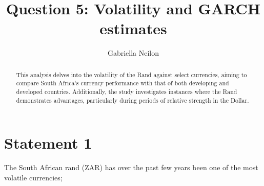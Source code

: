 \documentclass[11pt,preprint, authoryear]{elsarticle}
\numberwithin{equation}{section}
\numberwithin{figure}{section}
\numberwithin{table}{section}
\begin{document}
\begin{frontmatter}  %

\title{Question 5: Volatility and GARCH estimates}





\author[Add1]{Gabriella Neilon}





\address[Add1]{Stellenbosch University}


\begin{abstract}
\small{
This analysis delves into the volatility of the Rand against select
currencies, aiming to compare South Africa's currency performance with
that of both developing and developed countries. Additionally, the study
investigates instances where the Rand demonstrates advantages,
particularly during periods of relative strength in the Dollar.
}
\end{abstract}

\vspace{1cm}





\vspace{0.5cm}

\end{frontmatter}

\setcounter{footnote}{0}



\pagestyle{fancy}
\chead{}
\rhead{}
\lfoot{}
\lhead{}
\cfoot{}


\headsep 35pt %




\hypertarget{statement-1}{%
\section{Statement 1}\label{statement-1}}

The South African rand (ZAR) has over the past few years been one of the
most volatile currencies;
\end{document}

